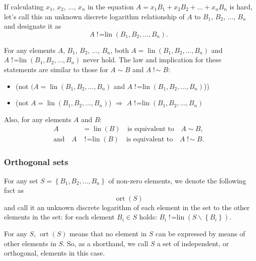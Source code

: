 \documentclass{mathcryptology} %
\DeclareMathOperator{\notsim}{!\!\sim}
\DeclareMathOperator{\lin}{lin}
\DeclareMathOperator{\notlin}{!\!=lin}
\DeclareMathOperator{\ort}{ort}
\theoremstyle{title}
\theoremstyle{titleof}
\begin{document}
    If calculating $x_{1}$, $x_{2}$, ${\dots}$, $x_{n}$ in the equation $A=x_{1}B_{1}+x_{2}B_{2}+{\dots}+x_{n}B_{n}$ is hard, let's call this an unknown discrete logarithm relationship of $A$ to $B_{1}$, $B_{2}$, ${\dots}$, $B_{n}$ and designate it as
    \begin{equation*}
        A\notlin\left(B_{1}, B_{2}, {\dots}, B_{n}\right).
    \end{equation*}
    
    For any elements $A$, $B_{1}$, $B_{2}$, ${\dots}$, $B_{n}$, both $A=\lin\left(B_{1}, B_{2}, {\dots}, B_{n}\right)$ and $A\notlin\left(B_{1}, B_{2}, {\dots}, B_{n}\right)$ never hold. The law and implication for these statements are similar to those for $A\sim B$ and $A\notsim B$:
    \begin{itemize}
        \item (not $(A=\lin\left(B_{1}, B_{2}, {\dots}, B_{n}\right)$ and $A\notlin\left(B_{1}, B_{2}, {\dots}, B_{n}\right)$))
        \item (not $A=\lin\left(B_{1}, B_{2}, {\dots}, B_{n}\right)$) $\Rightarrow$ $A\notlin\left(B_{1}, B_{2}, {\dots}, B_{n}\right)$
    \end{itemize}
    Also, for any elements $A$ and $B$:
    \begin{align*}
                        A & =\lin\left(B\right)  \quad\text{is equivalent to}\quad A\sim B,\\
        \text{and}\quad A & \notlin\left(B\right) \quad\text{is equivalent to}\quad A\notsim B.
    \end{align*}


\subsubsection{Orthogonal sets}
    For any set $S=\left\{B_{1}, B_{2}, {\dots}, B_{n}\right\}$ of non-zero elements, we denote the following fact as
    \begin{equation*}
        \ort\left(S\right)
    \end{equation*}
    and call it an unknown discrete logarithm of each element in the set to the other elements in the set: for each element $B_{i}\in S$ holds: $B_{i}\notlin\left(S{\backslash}\left\{B_{i}\right\}\right)$.

    For any $S$, $\ort\left(S\right)$ means that no element in $S$ can be expressed by means of other elements in $S$. So, as a shorthand, we call $S$ a set of independent, or orthogonal, elements in this case.
\end{document}
